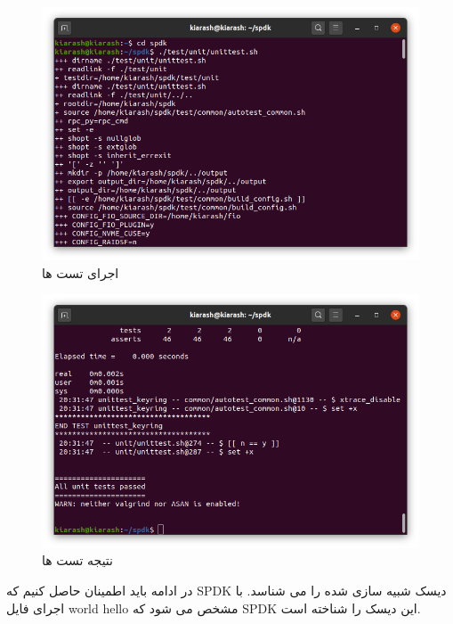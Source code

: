 \begin{figure}[H]
    \centering
    \includegraphics[width=\textwidth]{figs/test.png}
    \caption{اجرای تست ها}
\end{figure}

\begin{figure}[H]
    \centering
    \includegraphics[width=\textwidth]{figs/pass.png}
    \caption{نتیجه تست ها}
\end{figure}

در ادامه باید اطمینان حاصل کنیم که SPDK دیسک شبیه سازی شده را می شناسد. با اجرای فایل world hello مشخص می شود که SPDK این دیسک را شناخته است.

